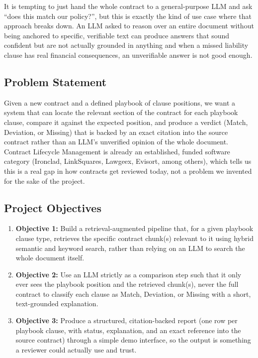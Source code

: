 \documentclass[11pt]{article}
\begin{document}
It is tempting to just hand the whole contract to a general-purpose LLM
and ask ``does this match our policy?'', but this is exactly the kind of
use case where that approach breaks down. An LLM asked to reason over an
entire document without being anchored to specific, verifiable text can
produce answers that sound confident but are not actually grounded in
anything and when a missed liability clause has real financial
consequences, an unverifiable answer is not good enough.

\subsection{Problem Statement}

Given a new contract and a defined playbook of clause positions, we want
a system that can locate the relevant section of the contract for each
playbook clause, compare it against the expected position, and produce a
verdict (Match, Deviation, or Missing) that is backed by an exact
citation into the source contract rather than an LLM's unverified
opinion of the whole document. Contract Lifecycle Management is already
an established, funded software category (Ironclad, LinkSquares,
Lawgeex, Evisort, among others), which tells us this is a real gap in
how contracts get reviewed today, not a problem we invented for the
sake of the project.

\subsection{Project Objectives}

\begin{enumerate}
  \item \textbf{Objective 1:} Build a retrieval-augmented pipeline that,
    for a given playbook clause type, retrieves the specific contract
    chunk(s) relevant to it using hybrid semantic and keyword search,
    rather than relying on an LLM to search the whole document itself.
  \item \textbf{Objective 2:} Use an LLM strictly as a comparison step such that
    it only ever sees the playbook position and the retrieved chunk(s),
    never the full contract to classify each clause as Match,
    Deviation, or Missing with a short, text-grounded explanation.
  \item \textbf{Objective 3:} Produce a structured, citation-backed
    report (one row per playbook clause, with status, explanation, and
    an exact reference into the source contract) through a simple demo
    interface, so the output is something a reviewer could actually use
    and trust.
\end{enumerate}
\end{document}
